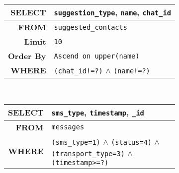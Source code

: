 \begin{appendices}
\begin{figure}
\begin{subfigure}{\columnwidth}
  {\small
    \begin{tabular}{r|p{60mm}}
    \textbf{SELECT} & 
            {\texttt{suggestion\_type}}, {\texttt{name}},
        {\texttt{chat\_id}}\\ \hline
    \textbf{FROM} &
        \texttt{{\texttt{suggested\_contacts}}}\\ \hline
       \textbf{Limit} &
        \textcolor{light-gray}{\texttt{{\texttt{10}}}}\\ \hline
        \textbf{Order By} &
        \textcolor{light-gray}{\texttt{{\texttt{Ascend on upper(name)}}}}\\ \hline
    \textbf{WHERE} &
        \texttt{(chat\_id!=?)} $\wedge$
        {\texttt{(name!=?)}}
    \end{tabular}
  }
  \label{fig:cluster4}
\end{subfigure}\\[2mm]

\begin{subfigure}{\columnwidth}
  {\small
    \begin{tabular}{r|p{60mm}}
    \textbf{SELECT} & 
            \textcolor{mid-gray}{{\texttt{sms\_type}}},  \textcolor{mid-gray}{{\texttt{timestamp}}},
         \textcolor{mid-gray}{{\texttt{\_id}}}\\ \hline
    \textbf{FROM} &
        \texttt{{\texttt{messages}}}\\ \hline
    \textbf{WHERE} &
        \texttt{(sms\_type=1)} $\wedge$
        {\texttt{(status=4)}} $\wedge$
         {\texttt{(transport\_type=3)}} $\wedge$
         \textcolor{mid-gray}{{\texttt{(timestamp>=?)}}}
    \end{tabular}
  }
  \label{fig:cluster5}
\end{subfigure}\\[2mm]

\label{fig:visualizepocketdatabyitsnaivemixturesummary}
\trimfigurewhitespace
\end{figure}
\end{appendices}


